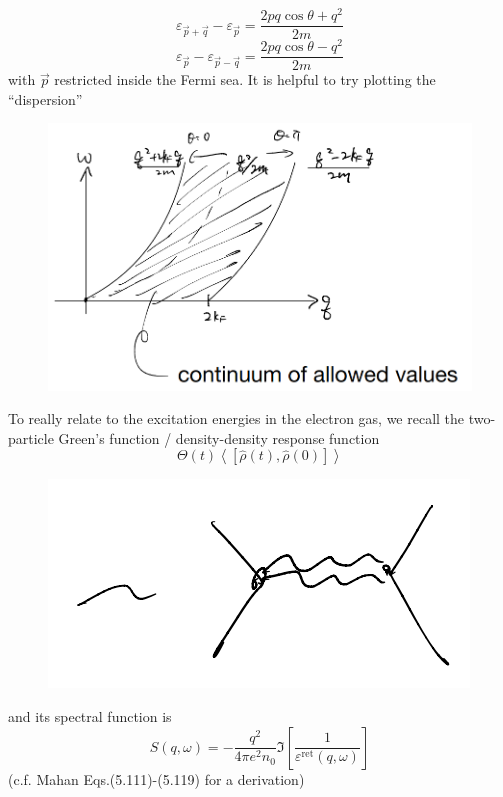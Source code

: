 \[ \varepsilon _{\vec{p}+\vec{q}}-\varepsilon _{\vec{p}}=\frac{2pq\cos \theta +q^2}{2m}\]
\[ \varepsilon _{\vec{p}}-\varepsilon _{\vec{p}-\vec{q}}=\frac{2pq\cos \theta -q^2}{2m}\]
with $\vec{p}$ restricted inside the Fermi sea. It is helpful to try plotting the ``dispersion''
\begin{figure}[H]
    \centering
    \includegraphics[width=\textwidth]{jupyterbook/data/fig/lec21-fig00.png}
\end{figure}
To really relate to the excitation energies in the electron gas, we recall the two-particle Green's function / density-density response function
\[ \Theta \left( t \right) \left< \left[ \hat{\rho}\left( t \right) ,\hat{\rho}\left( 0 \right) \right] \right> \]
\begin{figure}[H]
    \centering
    \includegraphics[width=\textwidth]{jupyterbook/data/fig/lec21-fig01.png}
\end{figure}
and its spectral function is
\[ S\left( q,\omega \right) =-\frac{q^2}{4\pi e^2n_0}\Im \left[ \frac{1}{\varepsilon ^{\mathrm{ret}}\left( q,\omega \right)} \right] \]
(c.f. Mahan Eqs.(5.111)-(5.119) for a derivation)

